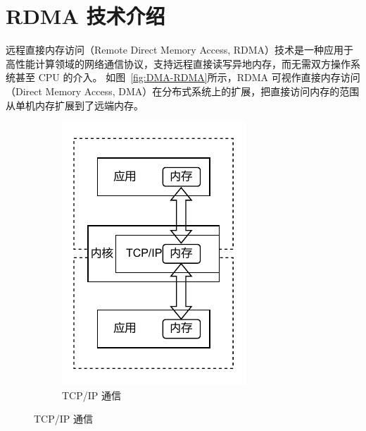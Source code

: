 {    \section{RDMA 技术介绍}\label{RDMA 技术介绍}
    远程直接内存访问（Remote Direct Memory Access, RDMA）技术是一种应用于高性能计算领域的网络通信协议，支持远程直接读写异地内存，而无需双方操作系统甚至 CPU 的介入。
    如图~\ref{fig:DMA-RDMA}所示，RDMA 可视作直接内存访问（Direct Memory Access, DMA）在分布式系统上的扩展，把直接访问内存的范围从单机内存扩展到了远端内存。
    \begin{figure}[!htbp]
        \centering
        \begin{subfigure}[b]{0.30\textwidth}
            \includegraphics[width=\textwidth]{Img/TCP_IP通信.drawio.pdf}
            \caption{TCP/IP 通信}
            \label{fig:TCPIP}
        \end{subfigure}%

\end{figure}}
